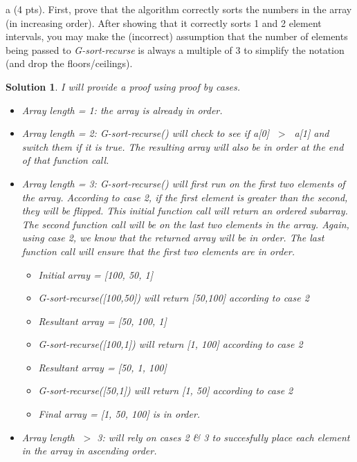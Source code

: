 \documentclass[11pt]{article}
\newtheorem*{solution}{Solution}
\begin{document}
\begin{enumerate}
a (4 pts). First, prove that the algorithm correctly sorts the numbers in the array (in increasing order).  
After showing that it correctly sorts 1 and 2 element intervals, you may make the (incorrect) assumption that the number of elements being passed to \emph{G-sort-recurse} is always a multiple of 3 to simplify the notation (and drop the floors/ceilings). 
\begin{solution}
	\item I will provide a proof using proof by cases.
	\begin{itemize}
		\item[1.] Array length = 1: the array is already in order. 
		\item[2.] Array length = 2: \emph{G-sort-recurse()} will check to see if a[0] $\;>\;$ a[1] and switch them if it is true. The resulting array will also be in order at the end of that function call.  
		\item[3.] Array length = 3: \emph{G-sort-recurse()} will first run on the first two elements of the array. According to case 2, if the first element is greater than the second, they will be flipped. This initial function call will return an ordered subarray. The second function call will be on the last two elements in the array. Again, using case 2, we know that the returned array will be in order. The last function call will ensure that the first two elements are in order. 
		\begin{itemize}
			\item[a)] Initial array = [100, 50, 1]
			\item[b)] \emph{G-sort-recurse([100,50])} will return [50,100] according to case 2
			\item[c)] Resultant array = [50, 100, 1]
			\item[d)] \emph{G-sort-recurse([100,1])} will return [1, 100] according to case 2
			\item[e)] Resultant array = [50, 1, 100]
			\item[f)] \emph{G-sort-recurse([50,1])} will return [1, 50] according to case 2
			\item[g)] Final array = [1, 50, 100] is in order. 
		\end{itemize} 
		\item[4.] Array length $\;>$ 3: will rely on cases 2 \& 3 to succesfully place each element in the array in ascending order. 
	\end{itemize}
\end{solution}
\newpage


\end{enumerate}
\end{document}
